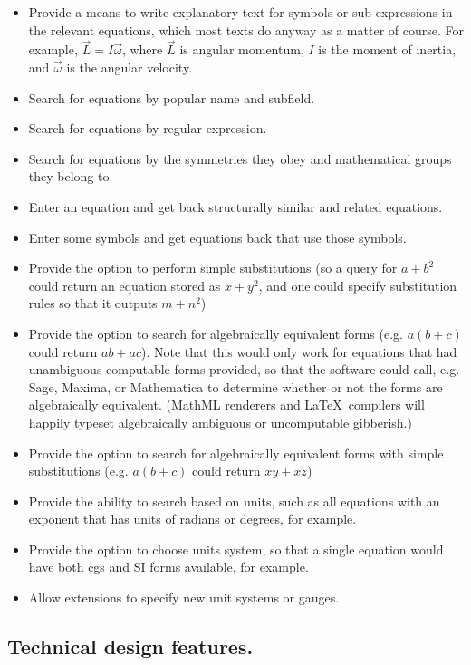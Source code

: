\documentclass[12pt,letterpaper]{article}
\begin{document}
\begin{itemize}
\item Provide a means to write explanatory text for symbols or sub-expressions in the relevant equations,
      which most texts do anyway as a matter of course.
      For example, $\vec{L} = I \vec{\omega}$, where
      $\vec{L}$ is angular momentum,
      $I$ is the moment of inertia, and
      $\vec{\omega}$ is the angular velocity.
\item Search for equations by popular name and subfield.
\item Search for equations by regular expression.
\item Search for equations by the symmetries they obey and mathematical groups they belong to.
\item Enter an equation and get back structurally similar and related equations.
\item Enter some symbols and get equations back that use those symbols.
\item Provide the option to perform simple substitutions
      (so a query for $a+b^2$ could return an equation stored as $x+y^2$,
      and one could specify substitution rules so that it outputs $m + n^2$)
\item Provide the option to search for algebraically equivalent forms
      (e.g. $a(b+c)$ could return $a b + a c$).
      Note that this would only work for equations that had unambiguous computable forms provided,
      so that the software could call,
      e.g. Sage, Maxima, or Mathematica to determine whether or not the forms are algebraically equivalent.
      (MathML renderers and \LaTeX\ compilers will happily typeset algebraically ambiguous or uncomputable gibberish.)
\item Provide the option to search for algebraically equivalent forms with simple substitutions
      (e.g.  $a(b+c)$ could return $ x y + x z$)
\item Provide the ability to search based on units,
      such as all equations with an exponent that has units of radians or degrees, for example.
\item Provide the option to choose units system,
      so that a single equation would have both cgs and SI forms available, for example.
\item Allow extensions to specify new unit systems or gauges.
\end{itemize}

\subsection{Technical design features.}
\end{document}
